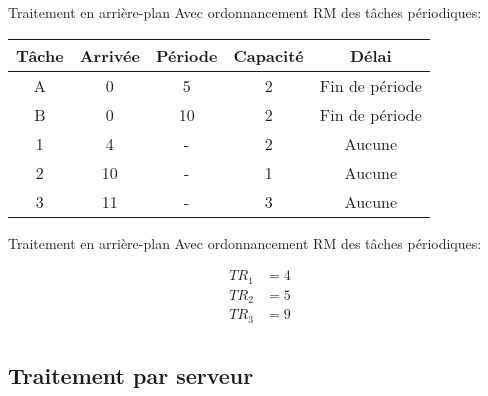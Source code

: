 \begin{frame}{Traitement en arrière-plan}
  Avec ordonnancement RM des tâches périodiques:
  \begin{center}
    \begin{tabular}{ccccc}
      \hline
      Tâche & Arrivée & Période & Capacité & Délai \\
      \hline
      A &  0 &  5 & 2 & Fin de période\\
      B &  0 & 10 & 2 & Fin de période\\
      1 &  4 &  - & 2 & Aucune\\
      2 & 10 &  - & 1 & Aucune\\
      3 & 11 &  - & 3 & Aucune\\
      \hline
    \end{tabular}
    \pause
    
  \end{center}
\end{frame}

\begin{frame}{Traitement en arrière-plan}
  Avec ordonnancement RM des tâches périodiques:
  \begin{center}
    
    \begin{align*}
      TR_1 &= 4\\
      TR_2 &= 5\\
      TR_3 &= 9\\
    \end{align*}
  \end{center}
\end{frame}

\subsection{Traitement par serveur}

